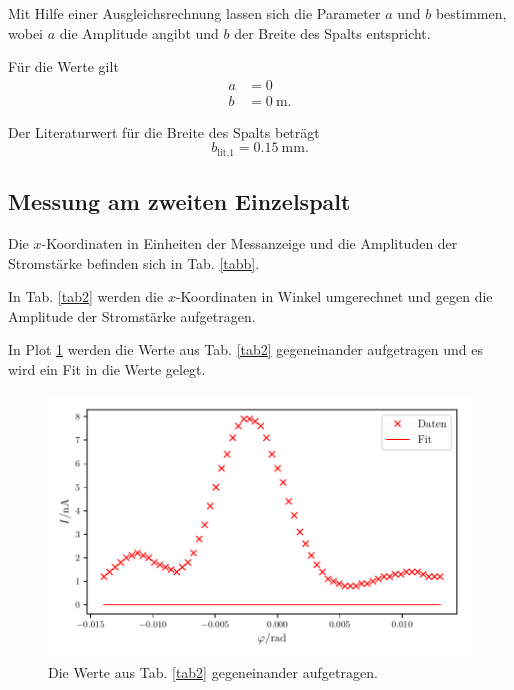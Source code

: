 \noindent Mit Hilfe einer Ausgleichsrechnung lassen sich die Parameter $a$ und $b$ bestimmen, wobei $a$ die Amplitude angibt und $b$ der Breite des Spalts entspricht. 

\noindent Für die Werte gilt %
\begin{align*}
    a &= \num{0} \\
    b &= \SI{0}{\meter}.
\end{align*}

\noindent Der Literaturwert für die Breite des Spalts beträgt
\begin{equation*}
    b_{\text{lit,1}} = \SI{0.15}{\milli\meter}.
\end{equation*}


\subsection{Messung am zweiten Einzelspalt}
Die $x$-Koordinaten in Einheiten der Messanzeige und die Amplituden der Stromstärke befinden sich in Tab. \ref{tabb}. 



\noindent In Tab. \ref{tab2} werden die $x$-Koordinaten in Winkel umgerechnet und gegen die Amplitude der Stromstärke aufgetragen. 

%


\noindent In Plot \ref{fig:plot2} werden die Werte aus Tab. \ref{tab2} gegeneinander aufgetragen und es wird ein Fit in die Werte gelegt. 
\begin{figure}
    \centering
    \includegraphics[width=12cm, height=7cm]{build/plot2.pdf}
    \caption{Die Werte aus Tab. \ref{tab2} gegeneinander aufgetragen.}
    \label{fig:plot2}
\end{figure}


